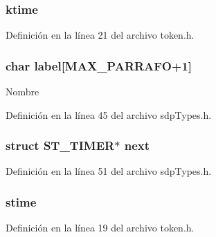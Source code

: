 \subsubsection[{ktime}]{ ktime}\label{struct_s_t___t_i_m_e_r_a4296c1722751cfeaf3d52cedf2bc212b}


Definición en la línea 21 del archivo token.\+h.

\hypertarget{struct_s_t___t_i_m_e_r_aa62a205ca9e35b3b88632d2ec557a5a0}{}
\subsubsection[{label}]{\setlength{\rightskip}{0pt plus 5cm}char label\mbox{[}{\bf M\+A\+X\+\_\+\+P\+A\+R\+R\+A\+F\+O}+1\mbox{]}}\label{struct_s_t___t_i_m_e_r_aa62a205ca9e35b3b88632d2ec557a5a0}
Nombre 

Definición en la línea 45 del archivo sdp\+Types.\+h.

\hypertarget{struct_s_t___t_i_m_e_r_ae1e8a4a6b208f964f72c50f97e978978}{}
\subsubsection[{next}]{\setlength{\rightskip}{0pt plus 5cm}struct {\bf S\+T\+\_\+\+T\+I\+M\+E\+R}$\ast$ next}\label{struct_s_t___t_i_m_e_r_ae1e8a4a6b208f964f72c50f97e978978}


Definición en la línea 51 del archivo sdp\+Types.\+h.

\hypertarget{struct_s_t___t_i_m_e_r_ab93a9231acb19c595671938b5b322772}{}
\subsubsection[{stime}]{ stime}\label{struct_s_t___t_i_m_e_r_ab93a9231acb19c595671938b5b322772}


Definición en la línea 19 del archivo token.\+h.

\hypertarget{struct_s_t___t_i_m_e_r_a9ff17a87e2d5c2c20efd3883fc5e8afd}{}
